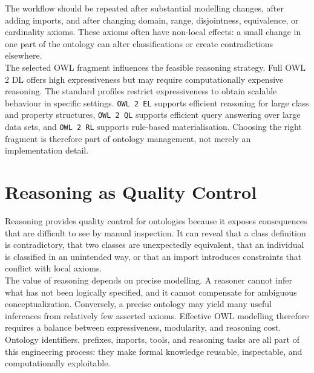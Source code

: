 \documentclass{scrbook}
\begin{document}
	The workflow should be repeated after substantial modelling changes, after adding imports, and after changing domain, range, disjointness, equivalence, or cardinality axioms. These axioms often have non-local effects: a small change in one part of the ontology can alter classifications or create contradictions elsewhere.\\
	
	The selected OWL fragment influences the feasible reasoning strategy. Full OWL 2 DL offers high expressiveness but may require computationally expensive reasoning. The standard profiles restrict expressiveness to obtain scalable behaviour in specific settings. \texttt{OWL 2 EL} supports efficient reasoning for large class and property structures, \texttt{OWL 2 QL} supports efficient query answering over large data sets, and \texttt{OWL 2 RL} supports rule-based materialisation. Choosing the right fragment is therefore part of ontology management, not merely an implementation detail.
	
	\section{Reasoning as Quality Control}
	
	Reasoning provides quality control for ontologies because it exposes consequences that are difficult to see by manual inspection. It can reveal that a class definition is contradictory, that two classes are unexpectedly equivalent, that an individual is classified in an unintended way, or that an import introduces constraints that conflict with local axioms.\\
	
	The value of reasoning depends on precise modelling. A reasoner cannot infer what has not been logically specified, and it cannot compensate for ambiguous conceptualization. Conversely, a precise ontology may yield many useful inferences from relatively few asserted axioms. Effective OWL modelling therefore requires a balance between expressiveness, modularity, and reasoning cost. Ontology identifiers, prefixes, imports, tools, and reasoning tasks are all part of this engineering process: they make formal knowledge reusable, inspectable, and computationally exploitable.
\end{document}
